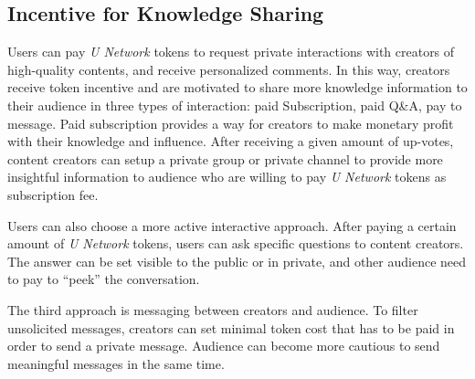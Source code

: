 \subsection{Incentive for Knowledge Sharing}

Users can pay \emph{U Network} tokens to request private interactions with creators of high-quality contents, and receive personalized comments. In this way, creators receive token incentive and are motivated to share more knowledge information to their audience in three types of interaction: paid Subscription, paid Q\&A, pay to message. 
Paid subscription provides a way for creators to make monetary profit with their knowledge and influence. After receiving a given amount of up-votes, content creators can setup a private group or private channel to provide more insightful information to audience who are willing to pay \emph{U Network} tokens as subscription fee. 
	
Users can also choose a more active interactive approach. After paying a certain amount of \emph{U Network} tokens, users can ask specific questions to content creators. The answer can be set visible to the public or in private, and other audience need to pay to ``peek'' the conversation.
						
The third approach is messaging between creators and audience. To filter unsolicited messages, creators can set minimal token cost that has to be paid in order to send a private message. Audience can become more cautious to send meaningful messages in the same time.
